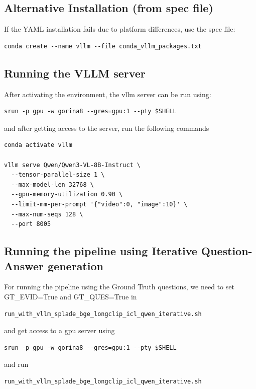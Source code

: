 \subsection{Alternative Installation (from spec file)}

If the YAML installation fails due to platform differences, use the spec file:

\begin{verbatim}
conda create --name vllm --file conda_vllm_packages.txt
\end{verbatim}

\subsection{Running the VLLM server}

After activating the environment, the vllm server can be run using:

\begin{verbatim}
srun -p gpu -w gorina8 --gres=gpu:1 --pty $SHELL
\end{verbatim}

and after getting access to the server, run the following commands

\begin{verbatim}
conda activate vllm

vllm serve Qwen/Qwen3-VL-8B-Instruct \
  --tensor-parallel-size 1 \
  --max-model-len 32768 \
  --gpu-memory-utilization 0.90 \
  --limit-mm-per-prompt '{"video":0, "image":10}' \
  --max-num-seqs 128 \
  --port 8005
\end{verbatim}

\subsection{Running the pipeline using Iterative Question-Answer generation}

For running the pipeline using the Ground Truth questions, we need to set GT\_EVID=True and GT\_QUES=True in \begin{verbatim}run_with_vllm_splade_bge_longclip_icl_qwen_iterative.sh\end{verbatim}

and get access to a gpu server using
\begin{verbatim}
srun -p gpu -w gorina8 --gres=gpu:1 --pty $SHELL
\end{verbatim}

and run 

\begin{verbatim}
run_with_vllm_splade_bge_longclip_icl_qwen_iterative.sh
\end{verbatim}

